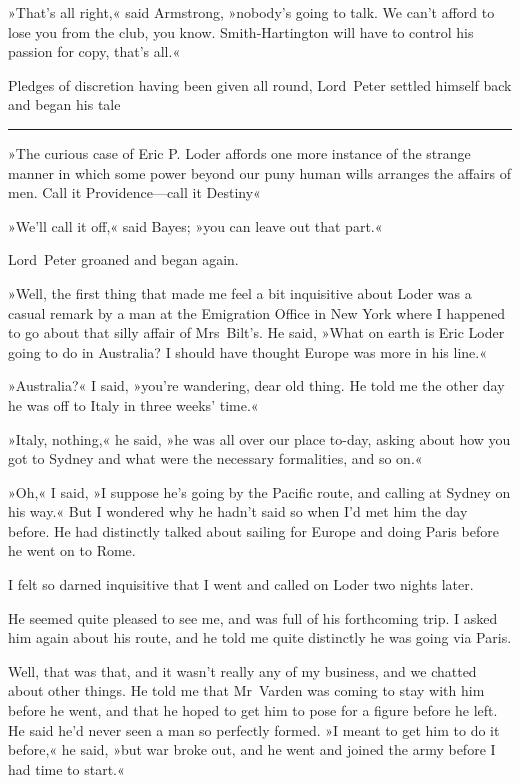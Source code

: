 »That's all right,« said Armstrong, »nobody's going to talk. We can't afford to lose you from the club, you know. Smith-Hartington will have to control his passion for copy, that's all.«

Pledges of discretion having been given all round, Lord~Peter settled himself back and began his tale

\noindent\hfil\rule{0.5\textwidth}{.4pt}\hfil 

»The curious case of Eric P. Loder affords one more instance of the strange manner in which some power beyond our puny human wills arranges the affairs of men. Call it Providence—call it Destiny\longdash«

»We'll call it off,« said Bayes; »you can leave out that part.«

Lord~Peter groaned and began again.

»Well, the first thing that made me feel a bit inquisitive about Loder was a casual remark by a man at the Emigration Office in New York where I happened to go about that silly affair of Mrs~Bilt's. He said, »What on earth is Eric Loder going to do in Australia? I should have thought Europe was more in his line.«

»Australia?« I said, »you're wandering, dear old thing. He told me the other day he was off to Italy in three weeks' time.«

»Italy, nothing,« he said, »he was all over our place to-day, asking about how you got to Sydney and what were the necessary formalities, and so on.«

»Oh,« I said, »I suppose he's going by the Pacific route, and calling at Sydney on his way.« But I wondered why he hadn't said so when I'd met him the day before. He had distinctly talked about sailing for Europe and doing Paris before he went on to Rome.

I felt so darned inquisitive that I went and called on Loder two nights later.

He seemed quite pleased to see me, and was full of his forthcoming trip. I asked him again about his route, and he told me quite distinctly he was going via Paris.

Well, that was that, and it wasn't really any of my business, and we chatted about other things. He told me that Mr~Varden was coming to stay with him before he went, and that he hoped to get him to pose for a figure before he left. He said he'd never seen a man so perfectly formed. »I meant to get him to do it before,« he said, »but war broke out, and he went and joined the army before I had time to start.«

